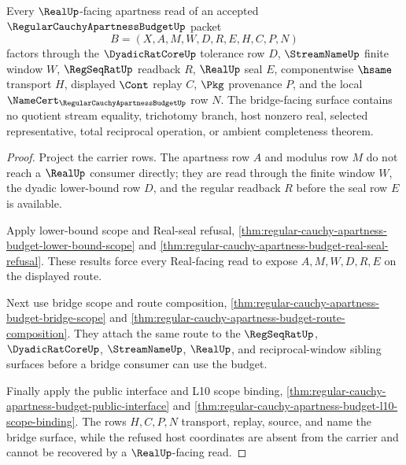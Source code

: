 \begin{theorem}
\label{thm:regular-cauchy-apartness-budget-bridge-surface}
Every $\RealUp$-facing apartness read of an accepted $\RegularCauchyApartnessBudgetUp$ packet
$$
B=(X,A,M,W,D,R,E,H,C,P,N)
$$
factors through the $\DyadicRatCoreUp$ tolerance row $D$, $\StreamNameUp$ finite window $W$, $\RegSeqRatUp$ readback $R$, $\RealUp$ seal $E$, componentwise $\hsame$ transport $H$, displayed $\Cont$ replay $C$, $\Pkg$ provenance $P$, and the local $\NameCert_{\RegularCauchyApartnessBudgetUp}$ row $N$. The bridge-facing surface contains no quotient stream equality, trichotomy branch, host nonzero real, selected representative, total reciprocal operation, or ambient completeness theorem.
\end{theorem}
\begin{proof}
Project the carrier rows. The apartness row $A$ and modulus row $M$ do not reach a $\RealUp$ consumer directly; they are read through the finite window $W$, the dyadic lower-bound row $D$, and the regular readback $R$ before the seal row $E$ is available.

Apply lower-bound scope and Real-seal refusal, \autoref{thm:regular-cauchy-apartness-budget-lower-bound-scope} and \autoref{thm:regular-cauchy-apartness-budget-real-seal-refusal}. These results force every Real-facing read to expose $A,M,W,D,R,E$ on the displayed route.

Next use bridge scope and route composition, \autoref{thm:regular-cauchy-apartness-budget-bridge-scope} and \autoref{thm:regular-cauchy-apartness-budget-route-composition}. They attach the same route to the $\RegSeqRatUp$, $\DyadicRatCoreUp$, $\StreamNameUp$, $\RealUp$, and reciprocal-window sibling surfaces before a bridge consumer can use the budget.

Finally apply the public interface and L10 scope binding, \autoref{thm:regular-cauchy-apartness-budget-public-interface} and \autoref{thm:regular-cauchy-apartness-budget-l10-scope-binding}. The rows $H,C,P,N$ transport, replay, source, and name the bridge surface, while the refused host coordinates are absent from the carrier and cannot be recovered by a $\RealUp$-facing read.
\end{proof}

